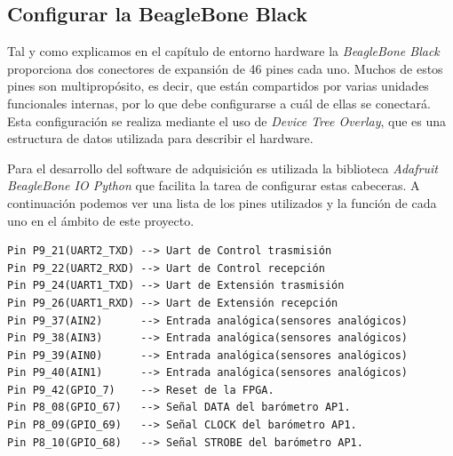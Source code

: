         \subsection{Configurar la BeagleBone Black}
            Tal y como explicamos en el capítulo de entorno hardware la
            \emph{BeagleBone Black} proporciona dos conectores de expansión de
            46 pines cada uno\cite{BeagleWikiExp}. Muchos de estos pines son
            multipropósito, es decir, que están compartidos por varias unidades
            funcionales internas, por lo que debe configurarse a cuál de ellas
            se conectará. Esta configuración se realiza mediante el uso de
            \emph{Device Tree Overlay}, que es una estructura de datos
            utilizada para describir el hardware.
            \par
            Para el desarrollo del software de adquisición es utilizada la
            biblioteca \emph{Adafruit BeagleBone IO Python}\cite{AdaFruitGit}
            que facilita la tarea de configurar estas cabeceras. A continuación
            podemos ver una lista de los pines utilizados y la función de cada
            uno en el ámbito de este proyecto.
            \begin{lstlisting}[style=myBash]
Pin P9_21(UART2_TXD) --> Uart de Control trasmisión
Pin P9_22(UART2_RXD) --> Uart de Control recepción
Pin P9_24(UART1_TXD) --> Uart de Extensión trasmisión
Pin P9_26(UART1_RXD) --> Uart de Extensión recepción
Pin P9_37(AIN2)	     --> Entrada analógica(sensores analógicos)
Pin P9_38(AIN3)	     --> Entrada analógica(sensores analógicos)
Pin P9_39(AIN0)	     --> Entrada analógica(sensores analógicos)
Pin P9_40(AIN1)	     --> Entrada analógica(sensores analógicos)
Pin P9_42(GPIO_7)    --> Reset de la FPGA.
Pin P8_08(GPIO_67)   --> Señal DATA del barómetro AP1.
Pin P8_09(GPIO_69)   --> Señal CLOCK del barómetro AP1.
Pin P8_10(GPIO_68)   --> Señal STROBE del barómetro AP1.
            \end{lstlisting}

